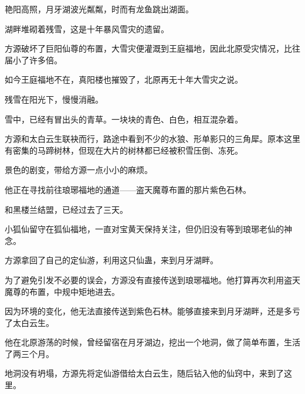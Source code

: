 \begin{this_body}
艳阳高照，月牙湖波光粼粼，时而有龙鱼跳出湖面。

湖畔堆砌着残雪，这是十年暴风雪灾的遗留。

方源破坏了巨阳仙尊的布置，大雪灾便灌溉到王庭福地，因此北原受灾情况，比往届小了许多倍。

如今王庭福地不在，真阳楼也摧毁了，北原再无十年大雪灾之说。

残雪在阳光下，慢慢消融。

雪中，已经有冒出头的青草。一块块的青色、白色，相互混杂着。

方源和太白云生联袂而行，路途中看到不少的水狼、形单影只的三角犀。原本这里有密集的马蹄树林，但现在大片的树林都已经被积雪压倒、冻死。

景色的剧变，带给方源一点小小的麻烦。

他正在寻找前往琅琊福地的通道——盗天魔尊布置的那片紫色石林。

和黑楼兰结盟，已经过去了三天。

小狐仙留守在狐仙福地，一直对宝黄天保持关注，但仍旧没有等到琅琊老仙的神念。

方源拿回了自己的定仙游，利用这只仙蛊，来到月牙湖畔。

为了避免引发不必要的误会，方源没有直接传送到琅琊福地。他打算再次利用盗天魔尊的布置，中规中矩地进去。

因为环境的变化，他无法直接传送到紫色石林。能够直接来到月牙湖畔，还是多亏了太白云生。

他在北原游荡的时候，曾经留宿在月牙湖边，挖出一个地洞，做了简单布置，生活了两三个月。

地洞没有坍塌，方源先将定仙游借给太白云生，随后钻入他的仙窍中，来到了这里。

\end{this_body}

